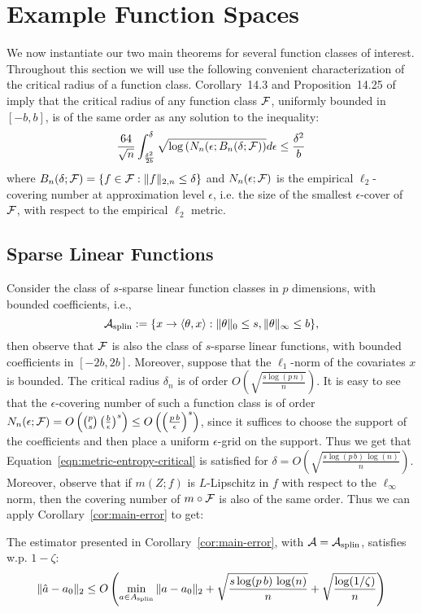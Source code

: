 \section{Example Function Spaces}\label{sec:examples}

We now instantiate our two main theorems for several function classes of interest. Throughout this section we will use the following convenient characterization of the critical radius of a function class. Corollary~14.3 and Proposition~14.25 of \cite{wainwright2019high} imply that the critical radius of any function class ${\mathcal F}$, uniformly bounded in $[-b,b]$, is of the same order as any solution to the inequality:
\begin{equation}\label{eqn:metric-entropy-critical}
    \frac{64}{\sqrt{n}} \int_{\frac{\delta^2}{2b}}^{\delta} \sqrt{\log\left(N_n(\epsilon; B_n(\delta; {\mathcal F})\right)} d\epsilon \leq \frac{\delta^2}{b}
\end{equation}
where $B_n(\delta; {\mathcal F})=\{f\in {\mathcal F}: \|f\|_{2,n}\leq \delta\}$ and $N_n(\epsilon; {\mathcal F})$ is the empirical $\ell_2$-covering number at approximation level $\epsilon$, i.e. the size of the smallest $\epsilon$-cover of ${\mathcal F}$, with respect to the empirical $\ell_2$ metric.

\subsection{Sparse Linear Functions}
Consider the class of $s$-sparse linear function classes in $p$ dimensions, with bounded coefficients, i.e., 
\begin{equation}
{\mathcal A}_{\text{splin}} :=\{x \to \langle \theta, x \rangle: \|\theta\|_{0} \leq s, \|\theta\|_{\infty}\leq b\},    
\end{equation}
then observe that ${\mathcal F}$ is also the class of $s$-sparse linear functions, with bounded coefficients in $[-2b,2b]$. Moreover, suppose that the $\ell_1$-norm of the covariates $x$ is bounded. The critical radius $\delta_n$ is of order $O\left(\sqrt{\frac{s\log(p\,n)}{n}}\right)$. It is easy to see that the $\epsilon$-covering number of such a function class is of order $N_n(\epsilon; {\mathcal F})=O\left(\binom{p}{s} \left(\frac{b}{\epsilon}\right)^{s}\right)\leq O\left(\left(\frac{p\,b}{\epsilon}\right)^s\right)$, since it suffices to choose the support of the coefficients and then place a uniform $\epsilon$-grid on the support. Thus we get that Equation~\eqref{eqn:metric-entropy-critical} is satisfied for $\delta=O\left(\sqrt{\frac{s\log(p\, b)\,\log(n)}{n}}\right)$. Moreover, observe that if $m(Z;f)$ is $L$-Lipschitz in $f$ with respect to the $\ell_{\infty}$ norm, then the covering number of $m\circ {\mathcal F}$ is also of the same order. Thus we can apply Corollary~\ref{cor:main-error} to get:
\begin{corollary}
    The estimator presented in Corollary~\ref{cor:main-error}, with ${\mathcal A}={\mathcal A}_{\text{splin}}$, satisfies w.p. $1-\zeta$:
    \begin{equation}
        \|\hat{a}-a_0\|_{2} \leq O\left(\min_{a\in A_{\text{splin}}} \|a-a_0\|_2 + \sqrt{\frac{s\log(p\, b)\,\log(n)}{n}} + \sqrt{\frac{\log(1/\zeta)}{n}}\right)
    \end{equation}
\end{corollary}


